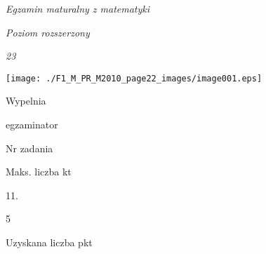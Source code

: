 \documentclass[a4paper,12pt]{article}
\begin{document}
{\it Egzamin maturalny z matematyki}

{\it Poziom rozszerzony}

{\it 23}
\begin{center}
\texttt{[image: ./F1\_M\_PR\_M2010\_page22\_images/image001.eps]}
\end{center}
Wypelnia

egzaminator

Nr zadania

Maks. liczba kt

11.

5

Uzyskana liczba pkt
\end{document}

